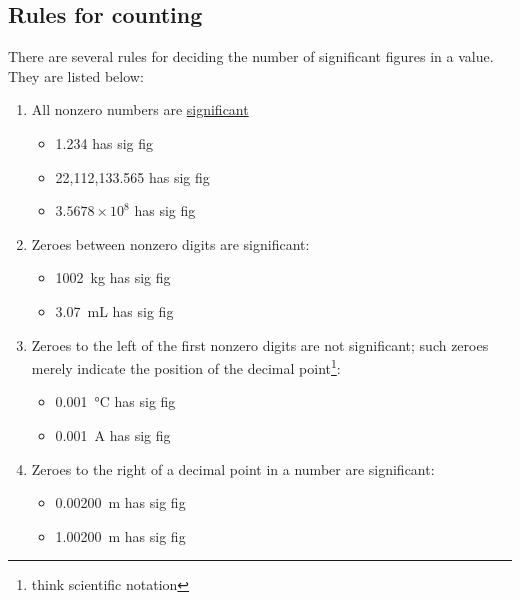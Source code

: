 \documentclass[a4paper]{tufte-handout}
\begin{document}
\subsection{Rules for counting}
There are several rules for deciding the number of significant figures in a value. They are listed below:
\begin{enumerate}
	\item All nonzero numbers are \uline{significant}
	\begin{itemize}
		\item 1.234 has \uline{\hspace{0.1 in}} sig fig
		\item 22,112,133.565 has \uline{\hspace{0.1 in}} sig fig
		\item $3.5678\times 10^8$ has \uline{\hspace{0.1 in}} sig fig
	\end{itemize}

	\item Zeroes between nonzero digits are significant:
	\begin{itemize}
		\item \SI{1002}{\kg} has \uline{\hspace{0.1 in}} sig fig
		\item \SI{3.07}{\mL} has \uline{\hspace{0.1 in}} sig fig
	\end{itemize}

	\item Zeroes to the left of the ﬁrst nonzero digits are not significant; such zeroes merely indicate the position of the decimal point\footnote{think scientific notation}:
	\begin{itemize}
		\item \SI{0.001}{\degreeCelsius} has \uline{\hspace{0.1 in}} sig fig
		\item \SI{0.001}{\ampere} has \uline{\hspace{0.1 in}} sig fig
	\end{itemize}

	\item Zeroes to the right of a decimal point in a number are significant:
	\begin{itemize}
		\item \SI{0.00200}{\m} has \uline{\hspace{0.1 in}} sig fig
		\item \SI{1.00200}{\m} has \uline{\hspace{0.1 in}} sig fig
	\end{itemize}


\end{enumerate}
\end{document}
